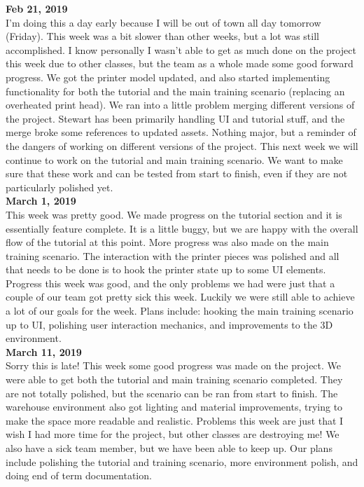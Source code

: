 \textbf{Feb 21, 2019}\\
I’m doing this a day early because I will be out of town all day tomorrow (Friday). This week was a bit slower than other weeks, but a lot was still accomplished. I know personally I wasn’t able to get as much done on the project this week due to other classes, but the team as a whole made some good forward progress. We got the printer model updated, and also started implementing functionality for both the tutorial and the main training scenario (replacing an overheated print head).
We ran into a little problem merging different versions of the project. Stewart has been primarily handling UI and tutorial stuff, and the merge broke some references to updated assets. Nothing major, but a reminder of the dangers of working on different versions of the project.
This next week we will continue to work on the tutorial and main training scenario. We want to make sure that these work and can be tested from start to finish, even if they are not particularly polished yet.\\

\textbf{March 1, 2019}\\
This week was pretty good. We made progress on the tutorial section and it is essentially feature complete. It is a little buggy, but we are happy with the overall flow of the tutorial at this point. More progress was also made on the main training scenario. The interaction with the printer pieces was polished and all that needs to be done is to hook the printer state up to some UI elements.
Progress this week was good, and the only problems we had were just that a couple of our team got pretty sick this week. Luckily we were still able to achieve a lot of our goals for the week.
Plans include: hooking the main training scenario up to UI, polishing user interaction mechanics, and improvements to the 3D environment.\\

\textbf{March 11, 2019}\\
Sorry this is late!
This week some good progress was made on the project. We were able to get both the tutorial and main training scenario completed. They are not totally polished, but the scenario can be ran from start to finish. The warehouse environment also got lighting and material improvements, trying to make the space more readable and realistic.
Problems this week are just that I wish I had more time for the project, but other classes are destroying me! We also have a sick team member, but we have been able to keep up.
Our plans include polishing the tutorial and training scenario, more environment polish, and doing end of term documentation.\\

